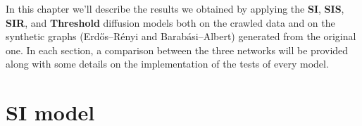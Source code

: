 In this chapter we'll describe the results we obtained by applying the \textbf{SI}, \textbf{SIS}, \textbf{SIR},
and \textbf{Threshold} diffusion models both on the crawled data and on the synthetic graphs (Erdős–Rényi and
Barabási–Albert) generated from the original one. In each section, a comparison between the three networks will be
provided along with some details on the implementation of the tests of every model.

\section{SI model} %
\label{sec:si_model}
    \begin{figure}[H]
        \centering
        \begin{subfigure}{0.45\textwidth}
\end{subfigure}
\end{figure}
